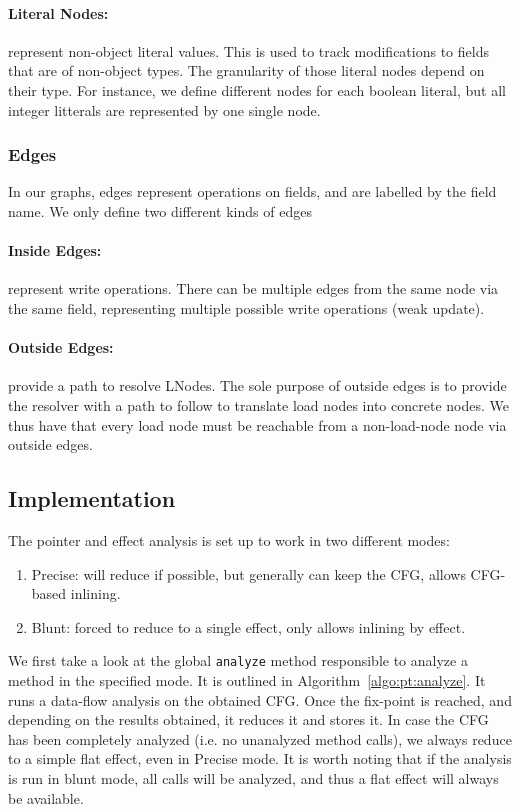 \documentclass[a4paper]{article}
\begin{document}
\paragraph{Literal Nodes:} represent non-object literal values. This is used to
track modifications to fields that are of non-object types. The granularity of
those literal nodes depend on their type. For instance, we define different
nodes for each boolean literal, but all integer litterals are represented by one
single node.

\subsubsection{Edges}
In our graphs, edges represent operations on fields, and are labelled by the
field name. We only define two different kinds of edges

\paragraph{Inside Edges:} represent write operations. There can be multiple
edges from the same node via the same field, representing multiple possible
write operations (weak update).

\paragraph{Outside Edges:} provide a path to resolve LNodes. The sole purpose
of outside edges is to provide the resolver with a path to follow to translate
load nodes into concrete nodes. We thus have that every load node must be
reachable from a non-load-node node via outside edges.

\subsection{Implementation}
The pointer and effect analysis is set up to work in two different modes:
\begin{enumerate}
    \item Precise: will reduce if possible, but generally can keep the CFG,
    allows CFG-based inlining.
    \item Blunt: forced to reduce to a single effect, only allows inlining by
    effect.
\end{enumerate}

We first take a look at the global \verb=analyze= method responsible to analyze
a method in the specified mode. It is outlined in
Algorithm~\ref{algo:pt:analyze}. It runs a data-flow analysis on the obtained
CFG.  Once the fix-point is reached, and depending on the results obtained, it
reduces it and stores it. In case the CFG has been completely analyzed (i.e. no
unanalyzed method calls), we always reduce to a simple flat effect, even in
Precise mode. It is worth noting that if the analysis is run in blunt mode, all
calls will be analyzed, and thus a flat effect will always be available.
\end{document}
